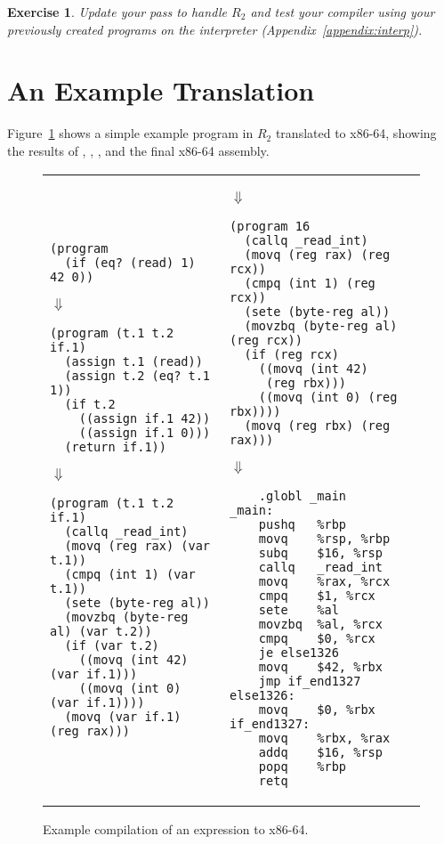 \documentclass[11pt]{book}
\newtheorem{exercise}[theorem]{Exercise}
\begin{document}
\begin{exercise}\normalfont
Update your  pass to handle $R_2$ and test
your compiler using your previously created programs on the
 interpreter (Appendix~\ref{appendix:interp}).
\end{exercise}


\section{An Example Translation}


Figure~\ref{fig:if-example-x86} shows a simple example program in
$R_2$ translated to x86-64, showing the results of ,
, , and the final
x86-64 assembly.

\begin{figure}[tbp]
\begin{tabular}{lll}
\begin{minipage}{0.5\textwidth}
\begin{lstlisting}
(program
  (if (eq? (read) 1) 42 0))
\end{lstlisting}
$\Downarrow$
\begin{lstlisting}
(program (t.1 t.2 if.1)
  (assign t.1 (read))
  (assign t.2 (eq? t.1 1))
  (if t.2
    ((assign if.1 42))
    ((assign if.1 0)))
  (return if.1))
\end{lstlisting}
$\Downarrow$
\begin{lstlisting}
(program (t.1 t.2 if.1)
  (callq _read_int)
  (movq (reg rax) (var t.1))
  (cmpq (int 1) (var t.1))
  (sete (byte-reg al))
  (movzbq (byte-reg al) (var t.2))
  (if (var t.2)
    ((movq (int 42) (var if.1)))
    ((movq (int 0) (var if.1))))
  (movq (var if.1) (reg rax)))
\end{lstlisting}
\end{minipage}
&
\begin{minipage}{0.4\textwidth}
$\Downarrow$
\begin{lstlisting}
(program 16
  (callq _read_int)
  (movq (reg rax) (reg rcx))
  (cmpq (int 1) (reg rcx))
  (sete (byte-reg al))
  (movzbq (byte-reg al) (reg rcx))
  (if (reg rcx)
    ((movq (int 42)
     (reg rbx)))
    ((movq (int 0) (reg rbx))))
  (movq (reg rbx) (reg rax)))
\end{lstlisting}
$\Downarrow$
\begin{lstlisting}
	.globl _main
_main:
	pushq	%rbp
	movq	%rsp, %rbp
	subq	$16, %rsp
	callq	_read_int
	movq	%rax, %rcx
	cmpq	$1, %rcx
	sete	%al
	movzbq	%al, %rcx
	cmpq	$0, %rcx
	je else1326
	movq	$42, %rbx
	jmp if_end1327
else1326:
	movq	$0, %rbx
if_end1327:
	movq	%rbx, %rax
	addq	$16, %rsp
	popq	%rbp
	retq
\end{lstlisting}
\end{minipage}
\end{tabular} 
\caption{Example compilation of an  expression to x86-64.}
\label{fig:if-example-x86}
\end{figure}
\end{document}
